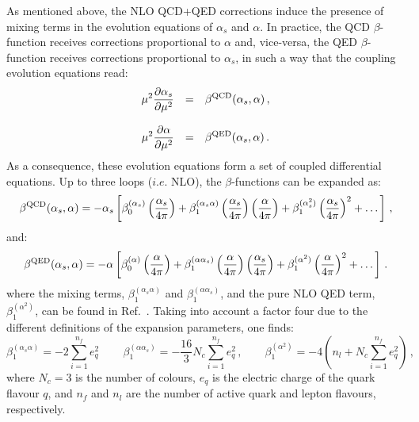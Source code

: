 As mentioned above, the NLO QCD+QED corrections induce the presence of
mixing terms in the evolution equations of $\alpha_s$ and $\alpha$.
%
In practice, the QCD $\beta$-function receives corrections
proportional to $\alpha$ and, vice-versa, the QED $\beta$-function
receives corrections proportional to $\alpha_s$, in such a way that
the coupling evolution equations read:
\begin{equation}\label{CoupledEq}
\begin{array}{rcl}
\displaystyle \mu^2\frac{\partial \alpha_s}{\partial \mu^2} &=& \displaystyle
                                                \beta^{\rm QCD}(\alpha_s,\alpha)\,,\\
\\
\displaystyle \mu^2\frac{\partial \alpha}{\partial \mu^2} &=& \displaystyle \beta^{\rm QED}(\alpha_s,\alpha)\,.
\end{array}
\end{equation}
As a consequence, these evolution equations form a set of coupled
differential equations. Up to three loops ($i.e.$ NLO), the
$\beta$-functions can be expanded as:
\begin{equation}
\beta^{\rm QCD}(\alpha_s,\alpha) = -\alpha_s\left[\beta_0^{(\alpha_s)}\left(\frac{\alpha_s}{4\pi}\right)+\beta_1^{(\alpha_s\alpha)}\left(\frac{\alpha_s}{4\pi}\right) \left(\frac{\alpha}{4\pi}\right)+\beta_1^{(\alpha_s^2)}\left(\frac{\alpha_s}{4\pi}\right)^2+\dots\right]\,,
\end{equation}
and:
\begin{equation}
\beta^{\rm QED}(\alpha_s,\alpha) = -\alpha\left[\beta_0^{(\alpha)}\left(\frac{\alpha}{4\pi}\right)+\beta_1^{(\alpha\alpha_s)}\left(\frac{\alpha}{4\pi}\right) \left(\frac{\alpha_s}{4\pi}\right)+\beta_1^{(\alpha^2)}\left(\frac{\alpha}{4\pi}\right)^2+\dots\right]\,.
\end{equation}
where the mixing terms, $\beta_1^{(\alpha_s\alpha)}$ and
$\beta_1^{(\alpha\alpha_s)}$, and the pure NLO QED term,
$\beta_1^{(\alpha^2)}$, can be found in
Ref.~\cite{Surguladze:1996hx}. Taking into account a factor four due
to the different definitions of the expansion parameters, one finds:
\begin{equation}\label{eq:NewBetaTerms}
\beta_1^{(\alpha_s\alpha)} = -2\sum_{i=1}^{n_f}
e_q^2\,\qquad\beta_1^{(\alpha\alpha_s)} = -\frac{16}{3}N_c\sum_{i=1}^{n_f} e_q^2\,,\qquad \beta_1^{(\alpha^2)} = -4\left(n_l+N_c\sum_{i=1}^{n_f} e_q^2\right)\,,
\end{equation}
where $N_c=3$ is the number of colours, $e_q$ is the electric charge
of the quark flavour $q$, and $n_f$ and $n_l$ are the number of active
quark and lepton flavours, respectively.


